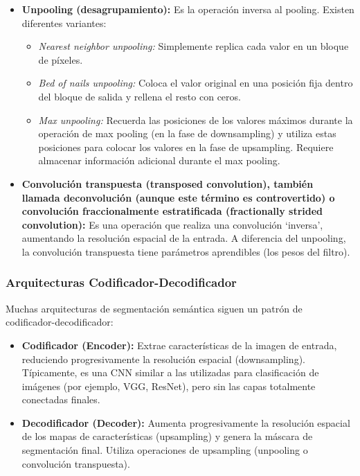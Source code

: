 \documentclass{article}
\begin{document}
\begin{itemize}
    \item \textbf{Unpooling (desagrupamiento):}  Es la operación inversa al pooling.  Existen diferentes variantes:
        \begin{itemize}
            \item \textit{Nearest neighbor unpooling:}  Simplemente replica cada valor en un bloque de píxeles.
            \item \textit{Bed of nails unpooling:}  Coloca el valor original en una posición fija dentro del bloque de salida y rellena el resto con ceros.
            \item \textit{Max unpooling:}  Recuerda las posiciones de los valores máximos durante la operación de max pooling (en la fase de downsampling) y utiliza estas posiciones para colocar los valores en la fase de upsampling.  Requiere almacenar información adicional durante el max pooling.
        \end{itemize}
    \item \textbf{Convolución transpuesta (transposed convolution), también llamada deconvolución (aunque este término es controvertido) o convolución fraccionalmente estratificada (fractionally strided convolution):}  Es una operación que realiza una convolución `inversa', aumentando la resolución espacial de la entrada.  A diferencia del unpooling, la convolución transpuesta tiene parámetros aprendibles (los pesos del filtro).
\end{itemize}

\subsubsection{Arquitecturas Codificador-Decodificador}

Muchas arquitecturas de segmentación semántica siguen un patrón de codificador-decodificador:

\begin{itemize}
    \item \textbf{Codificador (Encoder):}  Extrae características de la imagen de entrada, reduciendo progresivamente la resolución espacial (downsampling).  Típicamente, es una CNN similar a las utilizadas para clasificación de imágenes (por ejemplo, VGG, ResNet), pero sin las capas totalmente conectadas finales.
    \item \textbf{Decodificador (Decoder):}  Aumenta progresivamente la resolución espacial de los mapas de características (upsampling) y genera la máscara de segmentación final.  Utiliza operaciones de upsampling (unpooling o convolución transpuesta).
\end{itemize}
\end{document}

